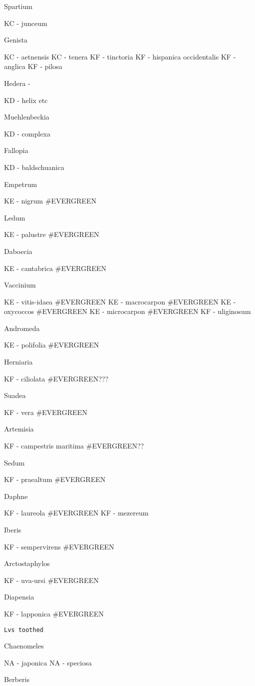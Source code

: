 \documentclass[openany]{book}
\begin{document}
Spartium

KC - junceum

Genista

KC - aetnensis KC - tenera KF - tinctoria KF - hispanica occidentalis KF
- anglica KF - pilosa

Hedera -

KD - helix etc

Muehlenbeckia

KD - complexa

Fallopia

KD - baldschuanica

Empetrum

KE - nigrum \#EVERGREEN

Ledum

KE - palustre \#EVERGREEN

Daboecia

KE - cantabrica \#EVERGREEN

Vaccinium

KE - vitis-idaea \#EVERGREEN KE - macrocarpon \#EVERGREEN KE - oxycoccos
\#EVERGREEN KE - microcarpon \#EVERGREEN KF - uliginosum

Andromeda

KE - polifolia \#EVERGREEN

Herniaria

KF - ciliolata \#EVERGREEN???

Suadea

KF - vera \#EVERGREEN

Artemisia

KF - campestris maritima \#EVERGREEN??

Sedum

KF - praealtum \#EVERGREEN

Daphne

KF - laureola \#EVERGREEN KF - mezereum

Iberis

KF - sempervirens \#EVERGREEN

Arctostaphylos

KF - uva-ursi \#EVERGREEN

Diapensia

KF - lapponica \#EVERGREEN

\begin{verbatim}
Lvs toothed
\end{verbatim}

Chaenomeles

NA - japonica NA - speciosa

Berberis
\end{document}

